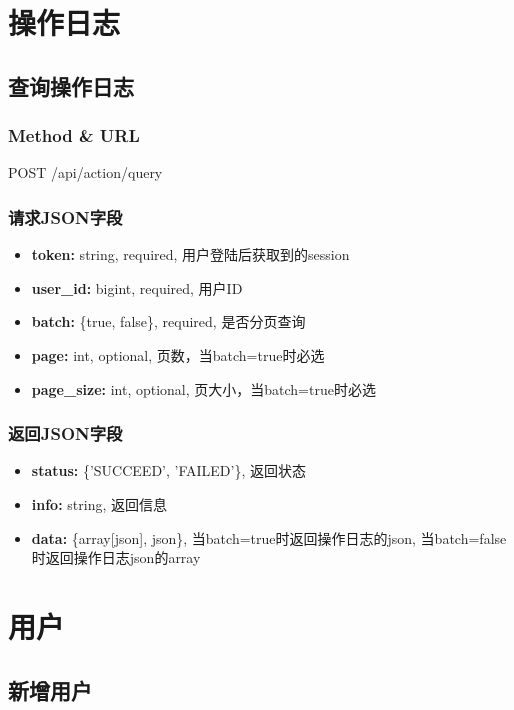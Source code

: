 ﻿\documentclass[a4paper]{report}
\begin{document}
\section{操作日志} %
\subsection{查询操作日志} %
\subsubsection{Method \& URL} %
POST /api/action/query

\subsubsection{请求JSON字段}
\begin{itemize}
	\item \textbf{token:} string, required, 用户登陆后获取到的session
	\item \textbf{user\_id:} bigint, required, 用户ID
	\item \textbf{batch:} \{true, false\}, required, 是否分页查询
	\item \textbf{page:} int, optional, 页数，当batch=true时必选
	\item \textbf{page\_size:} int, optional, 页大小，当batch=true时必选
\end{itemize}

\subsubsection{返回JSON字段}
\begin{itemize}
	\item \textbf{status:} \{'SUCCEED', 'FAILED'\}, 返回状态
	\item \textbf{info:} string, 返回信息
	\item \textbf{data:} \{array[json], json\}, 当batch=true时返回操作日志的json, 当batch=false时返回操作日志json的array
\end{itemize}






\section{用户} %
\subsection{新增用户} %
\end{document}
